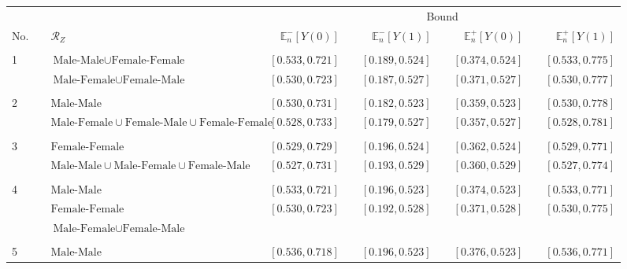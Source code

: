 \documentclass[10pt,a4paper,twoside]{article}
\numberwithin{equation}{section}
\begin{document}
\begin{sidewaystable}[p]
\centering
\caption{$\mathcal{R}_Z$ and admissible sets of values of $\mathbb{E}_n[Y(d)]$.}
\centering
\begin{subfigure}{\textwidth}
\centering
\begin{tabular}{lclcrcrcrcr}
\toprule
&	& &	& \multicolumn{7}{c}{Bound} \\
\cmidrule(r){4-11}	
No. & &	$\mathcal{R}_Z$	&	&	$\mathbb{E}_n^-[Y(0)]$	&	&	$\mathbb{E}_n^-[Y(1)]$	&	&	$\mathbb{E}_n^+[Y(0)]$	&	&	$\mathbb{E}_n^+[Y(1)]$\\
\midrule
& &\phantom{$\text{Male-Female}\cup\text{Female-Male}\cup\text{Female-Female}$}\\
1& & $\text{Male-Male}\cup\text{Female-Female}$	&	&	$[0.533,0.721]$	&	&	$[0.189,0.524]$	&	&	$[0.374,0.524]$	&	&	$[0.533,0.775]$
\\
& &$\text{Male-Female}\cup\text{Female-Male}$	&	&	\color{blue}$[0.530,0.723]$	&	&	\color{blue}$[0.187,0.527]$	&	&	\color{blue}$[0.371,0.527]$	&	&	\color{blue}$[0.530,0.777]$\\
\\
2 & &$\text{Male-Male}$	&	&	$[0.530,0.731]$	&	&	$[0.182,0.523]$	&	&	$[0.359,0.523]$	&	&	$[0.530,0.778]$
\\
& &$\text{Male-Female}\cup\text{Female-Male}\cup\text{Female-Female}$	&	&	\color{blue}$[0.528,0.733]$	&	&	\color{blue}$[0.179,0.527]$	&	&	\color{blue}$[0.357,0.527]$	&	&	\color{blue}$[0.528,0.781]$\\
\\
3 & &$\text{Female-Female}$	&	&	$[0.529,0.729]$	&	&	$[0.196,0.524]$	&	&	$[0.362,0.524]$	&	&	$[0.529,0.771]$
\\
& &$\text{Male-Male}\cup\text{Male-Female}\cup\text{Female-Male}$	& &\color{blue}$[0.527,0.731]$	&	&	\color{blue}$[0.193,0.529]$	&	&	\color{blue}$[0.360,0.529]$	&	&	\color{blue}$[0.527,0.774]$\\	
\\
4 & &$\text{Male-Male}$&	&	$[0.533,0.721]$	&	&	$[0.196,0.523]$	&	&	$[0.374,0.523]$	&	&	$[0.533,0.771]$
\\
& &$\text{Female-Female}$ & &\color{blue}$[0.530,0.723]$	&	&	\color{blue}$[0.192,0.528]$	&	&	\color{blue}$[0.371,0.528]$	&	&	\color{blue}$[0.530,0.775]$\\
& &$\text{Male-Female}\cup\text{Female-Male}$\\	
\\
5 & &$\text{Male-Male}$&	&	$[0.536,0.718]$	&	&	$[0.196,0.523]$	&	&	$[0.376,0.523]$	&	&	$[0.536,0.771]$

\end{tabular}
\end{subfigure}
\end{sidewaystable}
\end{document}
